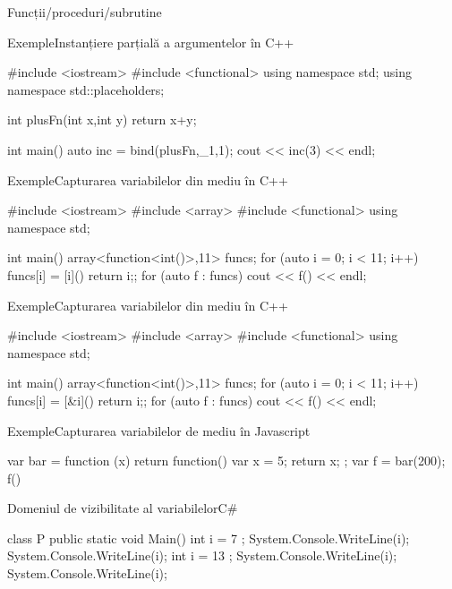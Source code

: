 \documentclass[xcolor=pdftex,romanian,colorlinks]{beamer}
\begin{document}
\begin{section}{Funcții/proceduri/subrutine}
\begin{frame}[fragile]{Exemple}{Instanțiere parțială a argumentelor în C++}
\begin{asciic}
#include <iostream>
#include <functional>
using namespace std;
using namespace std::placeholders;

int plusFn(int x,int y) {return x+y;}

int main()
{
    auto inc = bind(plusFn,_1,1);
    cout << inc(3) << endl;
}
\end{asciic}
\end{frame}


\begin{frame}[fragile]{Exemple}{Capturarea variabilelor din mediu în C++}
\begin{asciic}
#include <iostream>
#include <array>
#include <functional>
using namespace std;

int main() {
    array<function<int()>,11> funcs;
    for (auto i = 0; i < 11; i++) {
    	funcs[i] = [i]() {return i;};
    }
    for (auto f : funcs) {
    	cout << f() << endl;
    }
}
\end{asciic}
\end{frame}

\begin{frame}[fragile]{Exemple}{Capturarea variabilelor din mediu în C++}
\begin{asciic}
#include <iostream>
#include <array>
#include <functional>
using namespace std;

int main() {
    array<function<int()>,11> funcs;
    for (auto i = 0; i < 11; i++) {
    	funcs[i] = [&i]() {return i;};
    }
    for (auto f : funcs) {
    	cout << f() << endl;
    }
}
\end{asciic}
\end{frame}



\begin{frame}[fragile]{Exemple}{Capturarea variabilelor de mediu în Javascript}
\begin{asciijs}
var bar = function (x) { 
  return function() { var x = 5; return x; }; 
}
var f = bar(200);
f()
\end{asciijs}
\end{frame}

\begin{frame}[fragile]{Domeniul de vizibilitate al variabilelor}{C\#}
\begin{asciics}
class P {
    public static void Main() {
        int i = 7 ;
        System.Console.WriteLine(i);
        {
          System.Console.WriteLine(i);
          int i = 13 ;
          System.Console.WriteLine(i);
        }
        System.Console.WriteLine(i);
    }
}
\end{asciics}
\end{frame}


\end{section}
\end{document}
